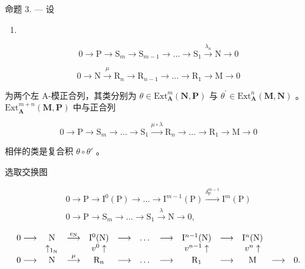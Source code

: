 命题 3. --- 设

\begin{enumerate}
\def\labelenumi{(\arabic{enumi})}
\setcounter{enumi}{5}
\tightlist
\item
\end{enumerate}

\[
0 \rightarrow \mathrm{P} \rightarrow \mathrm{S} _ {m} \rightarrow \mathrm{S} _ {m - 1} \rightarrow \dots \rightarrow \mathrm{S} _ {1} \stackrel {\lambda_ {n}} {\rightarrow} \mathrm{N} \rightarrow 0\tag{7}
\]

\[
0 \rightarrow \mathrm{N} \xrightarrow {\mu} \mathrm{R} _ {n} \rightarrow \mathrm{R} _ {n - 1} \rightarrow \dots \rightarrow \mathrm{R} _ {1} \rightarrow \mathrm{M} \rightarrow 0
\]

为两个左 A-模正合列，其类分别为 \(\theta\in\mathrm{Ext}_{\mathbf{A}}^{m}(\mathbf{N},\mathbf{P})\) 与 \(\theta^{\prime}\in\mathrm{Ext}_{\mathbf{A}}^{n}(\mathbf{M},\mathbf{N})\) 。 \(\mathrm{Ext}_{\mathbf{A}}^{m+n}(\mathbf{M},\mathbf{P})\) 中与正合列

\[
0 \to \mathrm{P} \to \mathrm{S} _ {m} \to \dots \to \mathrm{S} _ {1} \xrightarrow {\mu \circ \lambda} \mathrm{R} _ {n} \to \dots \to \mathrm{R} _ {1} \to \mathrm{M} \to 0\tag{8}
\]

相伴的类是复合积 \(\theta\circ\theta'\) 。

选取交换图

\[
\begin{array}{c} 0 \longrightarrow \mathrm{P} \longrightarrow \mathrm{I} ^ {0} (\mathrm{P}) \longrightarrow \dots \longrightarrow \mathrm{I} ^ {m - 1} (\mathrm{P}) \xrightarrow {\delta_ {\mathrm{P}} ^ {m - 1}} \mathrm{I} ^ {m} (\mathrm{P}) \\ 0 \longrightarrow \mathrm{P} \longrightarrow \mathrm{S} _ {m} \longrightarrow \dots \longrightarrow \mathrm{S} _ {1} \xrightarrow {\lambda} \mathrm{N} \longrightarrow 0, \end{array}
\]

\[
\begin{array}{c c c c c c c c c c c c} 0 \longrightarrow & \mathrm{N} & \stackrel {{e _ {\mathrm{N}}}} {{\longrightarrow}} & \mathrm{I} ^ {0} (\mathrm{N}) & \longrightarrow & \dots & \longrightarrow & \mathrm{I} ^ {n - 1} (\mathrm{N}) & \longrightarrow & \mathrm{I} ^ {n} (\mathrm{N}) \\ & \uparrow_ {1 _ {\mathrm{N}}} & & v ^ {0} \uparrow & & & & v ^ {n - 1} \uparrow & & v ^ {n} \uparrow \\ 0 \longrightarrow & \mathrm{N} & \stackrel {{\mu}} {{\longrightarrow}} & \mathrm{R} _ {n} & \longrightarrow & \dots & \longrightarrow & \mathrm{R} _ {1} & \longrightarrow & \mathrm{M} & \longrightarrow & 0. \end{array}
\]

